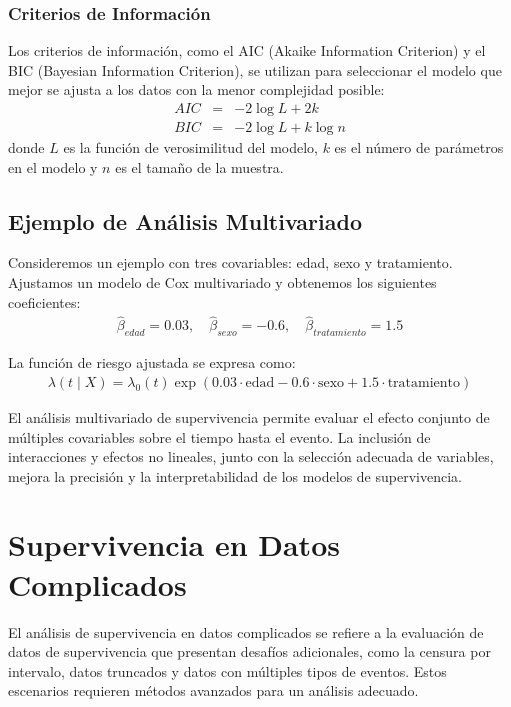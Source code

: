 \documentclass[a4paper]{report} %
\begin{document}
\subsection*{Criterios de Informaci\'on}
Los criterios de informaci\'on, como el AIC (Akaike Information Criterion) y el BIC (Bayesian Information Criterion), se utilizan para seleccionar el modelo que mejor se ajusta a los datos con la menor complejidad posible:
\begin{eqnarray*}
AIC &=& -2 \log L + 2k \\
BIC &=& -2 \log L + k \log n
\end{eqnarray*}
donde $L$ es la funci\'on de verosimilitud del modelo, $k$ es el n\'umero de par\'ametros en el modelo y $n$ es el tama\~no de la muestra.

\section*{Ejemplo de An\'alisis Multivariado}
Consideremos un ejemplo con tres covariables: edad, sexo y tratamiento. Ajustamos un modelo de Cox multivariado y obtenemos los siguientes coeficientes:
\begin{eqnarray*}
\hat{\beta}_{edad} = 0.03, \quad \hat{\beta}_{sexo} = -0.6, \quad \hat{\beta}_{tratamiento} = 1.5
\end{eqnarray*}

La funci\'on de riesgo ajustada se expresa como:
\begin{eqnarray*}
\lambda(t \mid X) = \lambda_0(t) \exp(0.03 \cdot \text{edad} - 0.6 \cdot \text{sexo} + 1.5 \cdot \text{tratamiento})
\end{eqnarray*}

El an\'alisis multivariado de supervivencia permite evaluar el efecto conjunto de m\'ultiples covariables sobre el tiempo hasta el evento. La inclusi\'on de interacciones y efectos no lineales, junto con la selecci\'on adecuada de variables, mejora la precisi\'on y la interpretabilidad de los modelos de supervivencia.


\chapter{Supervivencia en Datos Complicados}
El an\'alisis de supervivencia en datos complicados se refiere a la evaluaci\'on de datos de supervivencia que presentan desaf\'ios adicionales, como la censura por intervalo, datos truncados y datos con m\'ultiples tipos de eventos. Estos escenarios requieren m\'etodos avanzados para un an\'alisis adecuado.
\end{document}
